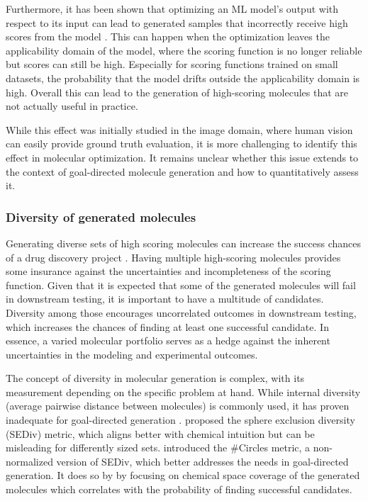 Furthermore, it has been shown that optimizing an ML model's output with respect to its input can
lead to generated samples that incorrectly receive high scores from the model
\citep{szegedyIntriguingPropertiesNeural2014,goodfellowExplainingHarnessingAdversarial2015}.
This can happen when the optimization leaves the applicability domain of the model, where
the scoring function is no longer reliable but scores can still be high. Especially for scoring
functions trained on small datasets, the probability that the model drifts outside the applicability
domain is high. Overall this can lead to the generation of high-scoring molecules that are not
actually useful in practice.

While this effect was initially studied in the image domain, where human vision can easily provide
ground truth evaluation, it is more challenging to identify this effect in molecular optimization.
It remains unclear whether this issue extends to the context of goal-directed molecule generation
and how to quantitatively assess it.

\subsubsection{Diversity of generated molecules}
Generating diverse sets of high scoring molecules can increase the success chances of a drug
discovery project
\citep{martinDiverseViewpointsComputational2001,gorseDiversityMedicinalChemistry2006}. Having
multiple high-scoring molecules provides some insurance against the uncertainties and incompleteness
of the scoring function. Given that it is expected that some of the generated molecules will fail in
downstream testing, it is important to have a multitude of candidates. Diversity among those encourages
uncorrelated outcomes in downstream testing, which increases the chances of finding at least one
successful candidate. In essence, a varied molecular portfolio serves as a hedge against the
inherent uncertainties in the modeling and experimental outcomes.

The concept of diversity in molecular generation is complex, with its measurement depending on the
specific problem at hand. While internal diversity (average pairwise distance between molecules) is
commonly used, it has proven inadequate for goal-directed generation
\citep{waldmanNovelAlgorithmsOptimization2000,xieMARSMarkovMolecular2021,thomasComparisonStructureLigandbased2021}.
\citet{thomasComparisonStructureLigandbased2021} proposed the sphere exclusion diversity (SEDiv)
metric, which aligns better with chemical intuition but can be misleading for differently sized
sets. \citet{xieHowMuchSpace2023} introduced the \#Circles metric, a non-normalized version of SEDiv,
which better addresses the needs in goal-directed generation. It does so by
by focusing on chemical space coverage of the generated molecules which correlates with
the probability of finding successful candidates.

